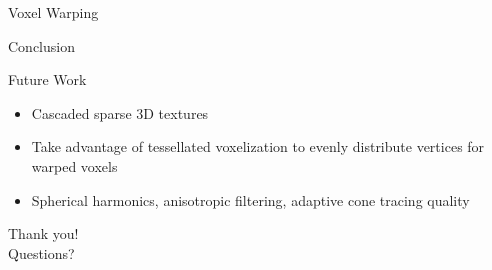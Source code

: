 \documentclass[10pt]{beamer}
\begin{document}
\begin{frame}{Voxel Warping}
\end{frame}

{
\begin{frame}{Conclusion}
\end{frame}}

\begin{frame}{Future Work}


  \begin{itemize}
    \item Cascaded sparse 3D textures %
    \item Take advantage of tessellated voxelization to evenly distribute vertices for warped voxels %
    \item Spherical harmonics, anisotropic filtering, adaptive cone tracing quality %
  \end{itemize}
\end{frame}

\begin{frame}[standout]
  \LARGE Thank you!\\
  \vspace{1cm}
  \LARGE Questions?
\end{frame}

\end{document}
